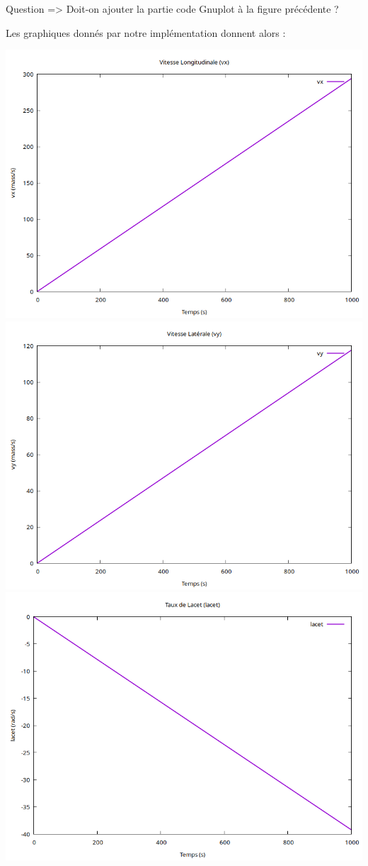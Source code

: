 {\LARGE Question => Doit-on ajouter la partie code Gnuplot à la figure précédente ?}

Les graphiques donnés par notre implémentation donnent alors :

\begin{center}
    \includegraphics[width=0.70\linewidth]{Plots_Etape1/vx}
    \includegraphics[width=0.70\linewidth]{Plots_Etape1/vy}
    \includegraphics[width=0.70\linewidth]{Plots_Etape1/lacet}
\end{center}



